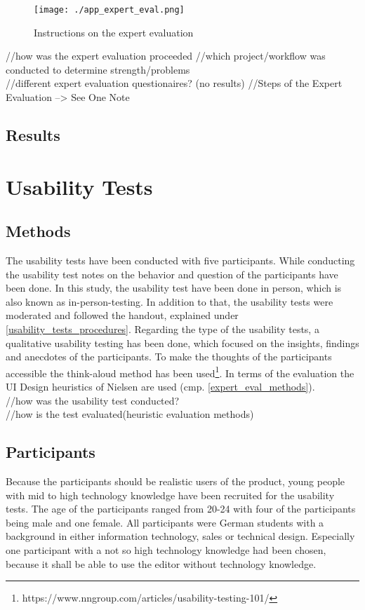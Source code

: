 \documentclass[]{article}
\begin{document}
\begin{figure}[h!tb]
	\centering
	\texttt{[image: ./app\_expert\_eval.png]}
	\caption{Instructions on the expert evaluation}
	\label{fig:app_expert_eval_instructions}
\end{figure}

//how was the expert evaluation proceeded
//which project/workflow was conducted to determine strength/problems\\
//different expert evaluation questionaires? (no results)
//Steps of the Expert Evaluation --> See One Note

\subsection{Results}
\section{Usability Tests}	
\subsection{Methods}
The usability tests have been conducted with five participants. While conducting the usability test notes on the behavior and question of the participants have been done. In this study, the usability test have been done in person, which is also known as in-person-testing. In addition to that, the usability tests were moderated and followed the handout, explained under \ref{usability_tests_procedures}. Regarding the type of the usability tests, a qualitative usability testing has been done, which focused on the insights, findings and anecdotes of the participants. To make the thoughts of the participants accessible the think-aloud method has been used\footnote{https://www.nngroup.com/articles/usability-testing-101/}. 
In terms of the evaluation the UI Design heuristics of Nielsen are used (cmp. \ref{expert_eval_methods}).\\
//how was the usability test conducted?\\
//how is the test evaluated(heuristic evaluation methods)
\subsection{Participants}
Because the participants should be realistic users of the product, young people with mid to high technology knowledge have been recruited for the usability tests. The age of the participants ranged from 20-24 with four of the participants being male and one female.  All participants were German  students with a background in either information technology, sales or technical design. Especially one participant with a not so high technology knowledge had been chosen, because it shall be able to use the editor without technology knowledge.
\end{document}
